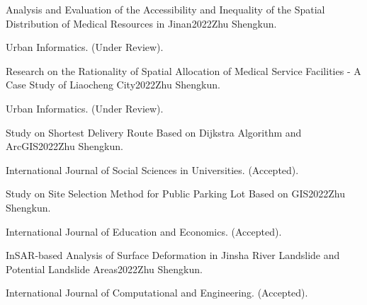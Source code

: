 \documentclass{joel_cv}
\begin{document}
\begin{enumerate}[label={[\arabic*]}]\setlength{\labelsep}{0.5em}\setlength{\itemindent}{0em}%
	

		\item \begin{sectionContentNormal}{Analysis and Evaluation of the Accessibility and Inequality of the Spatial Distribution of Medical Resources in Jinan}{2022}{Zhu Shengkun.}
		\item Urban Informatics. (Under Review).
	\end{sectionContentNormal}

		\item \begin{sectionContentNormal}{Research on the Rationality of Spatial Allocation of Medical Service Facilities - A Case Study of Liaocheng City}{2022}{Zhu Shengkun.}
	\item Urban Informatics. (Under Review).%
\end{sectionContentNormal}
	
	\item \begin{sectionContentNormal}{Study on Shortest Delivery Route Based on Dijkstra Algorithm and ArcGIS}{2022}{Zhu Shengkun.}
		\item International Journal of Social Sciences in Universities. (Accepted). 
	\end{sectionContentNormal}
	
	\item \begin{sectionContentNormal}{Study on Site Selection Method for Public Parking Lot Based on GIS}{2022}{Zhu Shengkun.}
		\item International Journal of Education and Economics. (Accepted). 
	\end{sectionContentNormal}
	
	\item \begin{sectionContentNormal}{InSAR-based Analysis of Surface Deformation in Jinsha River Landslide and Potential Landslide Areas}{2022}{Zhu Shengkun.}
	\item International Journal of Computational and Engineering. (Accepted). 
\end{sectionContentNormal}	
	

\end{enumerate}
\end{document}
